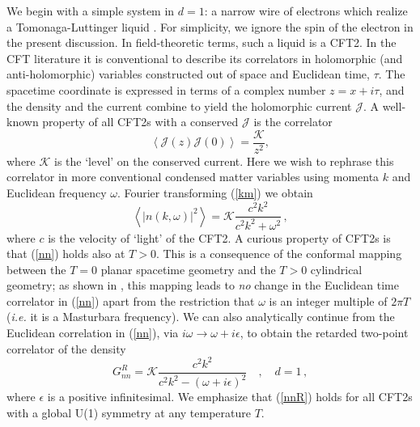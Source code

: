 \documentclass[10pt, oneside]{book}
\def\be{\begin{equation}}
\def\ee{\end{equation}}
\begin{document}
\begin{doublespace}
We begin with a simple system in $d=1$: a narrow wire of electrons which realize a Tomonaga-Luttinger liquid \cite{giamarchi03}.
For simplicity, we ignore the spin of the electron in the present discussion. In field-theoretic terms, such a liquid is a CFT2.
In the CFT literature it is conventional to describe its correlators in holomorphic (and anti-holomorphic) variables constructed out of space and Euclidean time, $\tau$. 
The spacetime coordinate is expressed in terms of a complex number $z=x+i\tau$, and the density and the current combine to yield the holomorphic current $\mathcal{J}$.
A well-known property of all CFT2s with a conserved $\mathcal{J}$ is the correlator
\be
\left\langle \mathcal{J} (z) \mathcal{J} (0) \right\rangle = \frac{\mathcal{K}}{z^2}, \label{km}
\ee
where $\mathcal{K}$ is the `level' on the conserved current. Here we wish to rephrase this correlator in more conventional condensed matter
variables using momenta $k$ and Euclidean frequency $\omega$. Fourier transforming (\ref{km}) we obtain
\be
\left \langle \left| n (k, \omega) \right|^2 \right \rangle = \mathcal{K} \frac{ c^2 k^2}{c^2 k^2 + \omega^2} \,, \label{nn}
\ee
where $c$ is the velocity of `light' of the CFT2. A curious property of CFT2s is that (\ref{nn}) holds also at $T>0$. This is a consequence of the conformal
mapping between the $T=0$ planar spacetime geometry and the $T>0$ cylindrical geometry; as shown in \cite{Herzog:2007ij}, 
this mapping leads to {\em no\/}
change in the Euclidean time correlator in (\ref{nn}) apart from the restriction that $\omega$ is an integer multiple of $2 \pi T$ ({\it i.e.\/} it is a
Masturbara frequency). We can also analytically continue from the Euclidean correlation in (\ref{nn}), via $i \omega \rightarrow \omega + i \epsilon$, 
to obtain the retarded two-point correlator of the density 
\be
G_{nn}^R = \mathcal{K} \frac{ c^2 k^2}{c^2 k^2 - (\omega + i \epsilon)^2} \quad, \quad d=1 \,, \label{nnR}
\ee
where $\epsilon$ is a positive infinitesimal. We emphasize that (\ref{nnR}) holds for all CFT2s with a global U(1) symmetry at any temperature $T$.


\end{doublespace}
\end{document}
